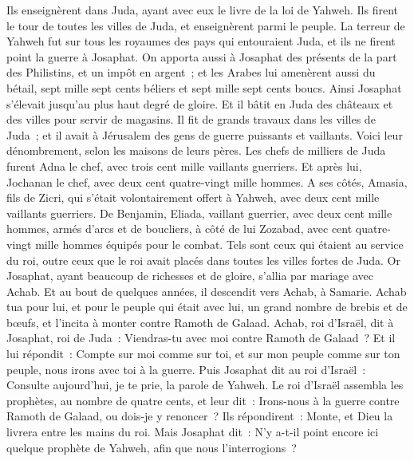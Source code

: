 \begin{multicols}{2}
Ils enseignèrent dans Juda, ayant avec eux le livre de la loi de Yahweh. Ils firent le tour de toutes les villes de Juda, et enseignèrent parmi le peuple.
La terreur de Yahweh fut sur tous les royaumes des pays qui entouraient Juda, et ils ne firent point la guerre à Josaphat.
On apporta aussi à Josaphat des présents de la part des Philistins, et un impôt en argent~; et les Arabes lui amenèrent aussi du bétail, sept mille sept cents béliers et sept mille sept cents boucs.
Ainsi Josaphat s'élevait jusqu'au plus haut degré de gloire. Et il bâtit en Juda des châteaux et des villes pour servir de magasins.
Il fit de grands travaux dans les villes de Juda~; et il avait à Jérusalem des gens de guerre puissants et vaillants.
Voici leur dénombrement, selon les maisons de leurs pères. Les chefs de milliers de Juda furent Adna le chef, avec trois cent mille vaillants guerriers.
Et après lui, Jochanan le chef, avec deux cent quatre-vingt mille hommes.
A ses côtés, Amasia, fils de Zicri, qui s'était volontairement offert à Yahweh, avec deux cent mille vaillants guerriers.
De Benjamin, Eliada, vaillant guerrier, avec deux cent mille hommes, armés d'arcs et de boucliers,
à côté de lui Zozabad, avec cent quatre-vingt mille hommes équipés pour le combat.
Tels sont ceux qui étaient au service du roi, outre ceux que le roi avait placés dans toutes les villes fortes de Juda.
\VerseOne{}Or Josaphat, ayant beaucoup de richesses et de gloire, s'allia par mariage avec Achab.
Et au bout de quelques années, il descendit vers Achab, à Samarie. Achab tua pour lui, et pour le peuple qui était avec lui, un grand nombre de brebis et de bœufs, et l'incita à monter contre Ramoth de Galaad.
Achab, roi d'Israël, dit à Josaphat, roi de Juda~: Viendras-tu avec moi contre Ramoth de Galaad~? Et il lui répondit~: Compte sur moi comme sur toi, et sur mon peuple comme sur ton peuple, nous irons avec toi à la guerre.
Puis Josaphat dit au roi d'Israël~: Consulte aujourd'hui, je te prie, la parole de Yahweh.
Le roi d'Israël assembla les prophètes, au nombre de quatre cents, et leur dit~: Irons-nous à la guerre contre Ramoth de Galaad, ou dois-je y renoncer~? Ils répondirent~: Monte, et Dieu la livrera entre les mains du roi.
Mais Josaphat dit~: N'y a-t-il point encore ici quelque prophète de Yahweh, afin que nous l'interrogions~?

\end{multicols}
